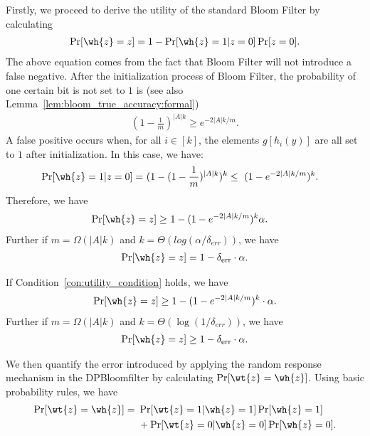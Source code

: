 Firstly, we proceed to derive the utility of the standard Bloom Filter by calculating 
\begin{align*}
    \Pr[\wh{z} = z] = 1 - \Pr[\wh{z} = 1 | z = 0] \Pr[z=0].
\end{align*}
The above equation comes from the fact that Bloom Filter will not introduce a false negative. After the initialization process of Bloom Filter, the probability of one certain bit is not set to $1$ is (see also Lemma~\ref{lem:bloom_true_accuracy:formal})
\begin{align*}
    (1-\frac{1}{m})^{|A|k} \geq e^{-2|A|k/m}.
\end{align*}
A false positive occurs when, for all $i \in [k]$, the elements $g[h_i(y)]$ are all set to $1$ after initialization. In this case, we have:
\begin{align*}
    \Pr[\wh{z} = 1 | z = 0] = & ~( 1 - (1 - \frac{1}{m})^{|A|k})^k \leq  ~ (1 - e^{-2|A|k/m})^k.
\end{align*}
Therefore, we have
\begin{align*}
    \Pr[\wh{z} = z] \geq & ~ 1 - (1 - e^{-2|A|k/m})^{k} \alpha.
\end{align*}
Further if $m = \Omega(|A|k)$ and $k = \Theta(log(\alpha/\delta_{err}))$, we have
\begin{align*}
    \Pr[\wh{z} = z] = 1 - \delta_{\mathrm{err}} \cdot \alpha.
\end{align*}
\begin{lemma} \label{lem:bloom_true_accuracy:informal}
If Condition~\ref{con:utility_condition} holds, we have
\begin{align*}
    \Pr [ \wh{z} = z ] \geq 1 - (1 - e^{-2|A| k / m})^k \cdot \alpha.
\end{align*}
Further if $m = \Omega(|A| k)$ and $k = \Theta(\log(1/\delta_{err}))$, we have
\begin{align*}
     \Pr [ \wh{z} = z ] \geq 1 - \delta_{\mathrm{err}} \cdot \alpha.
\end{align*}
\end{lemma}

We then quantify the error introduced by applying the random response mechanism in the DPBloomfilter by calculating $\Pr[\wt{z} = \wh{z}]$. Using basic probability rules, we have
\begin{align*}
    \Pr[\wt{z} = \wh{z}] = & ~ \Pr[\wt{z}=1|\wh{z}=1]\Pr[\wh{z}=1] \\
    & ~ +\Pr[\wt{z}=0|\wh{z}=0]\Pr[\wh{z}=0].
\end{align*}

